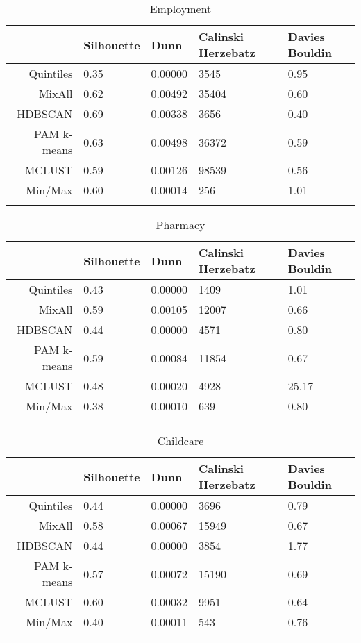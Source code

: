 \documentclass[10pt, a4paper]{article}
\begin{document}
 




\begin{longtable}{rllll}
  \hline
 & Silhouette & Dunn & Calinski Herzebatz & Davies Bouldin \\ 
  \hline
Quintiles & 0.35 & 0.00000 &  3545 & 0.95 \\ 
   \hline
MixAll & 0.62 & 0.00492 & 35404 & 0.60 \\ 
   \hline
HDBSCAN & 0.69 & 0.00338 &  3656 & 0.40 \\ 
   \hline
PAM k-means & 0.63 & 0.00498 & 36372 & 0.59 \\ 
   \hline
MCLUST & 0.59 & 0.00126 & 98539 & 0.56 \\ 
   \hline
Min/Max & 0.60 & 0.00014 &   256 & 1.01 \\ 
   \hline
\hline
\caption{Employment} 
\end{longtable}





 \pagebreak 
 
\begin{longtable}{rllll}
  \hline
 & Silhouette & Dunn & Calinski Herzebatz & Davies Bouldin \\ 
  \hline
Quintiles & 0.43 & 0.00000 &  1409 &  1.01 \\ 
   \hline
MixAll & 0.59 & 0.00105 & 12007 &  0.66 \\ 
   \hline
HDBSCAN & 0.44 & 0.00000 &  4571 &  0.80 \\ 
   \hline
PAM k-means & 0.59 & 0.00084 & 11854 &  0.67 \\ 
   \hline
MCLUST & 0.48 & 0.00020 &  4928 & 25.17 \\ 
   \hline
Min/Max & 0.38 & 0.00010 &   639 &  0.80 \\ 
   \hline
\hline
\caption{Pharmacy} 
\end{longtable}





 \pagebreak 
 
\begin{longtable}{rllll}
  \hline
 & Silhouette & Dunn & Calinski Herzebatz & Davies Bouldin \\ 
  \hline
Quintiles & 0.44 & 0.00000 &  3696 & 0.79 \\ 
   \hline
MixAll & 0.58 & 0.00067 & 15949 & 0.67 \\ 
   \hline
HDBSCAN & 0.44 & 0.00000 &  3854 & 1.77 \\ 
   \hline
PAM k-means & 0.57 & 0.00072 & 15190 & 0.69 \\ 
   \hline
MCLUST & 0.60 & 0.00032 &  9951 & 0.64 \\ 
   \hline
Min/Max & 0.40 & 0.00011 &   543 & 0.76 \\ 
   \hline
\hline
\caption{Childcare} 
\end{longtable}
\end{document}
